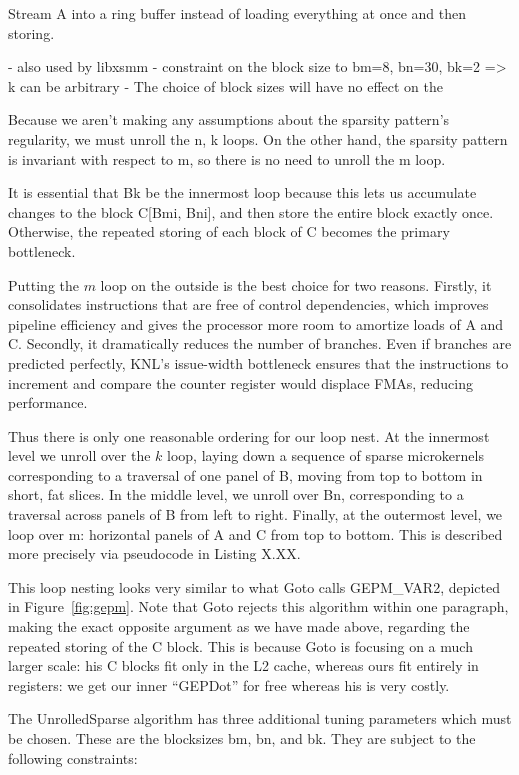 Stream A into a ring buffer instead of loading everything at once and then storing.

  - also used by libxsmm
  - constraint on the block size to bm=8, bn=30, bk=2 => k can be arbitrary
  - The choice of block sizes will have no effect on the 

Because we aren't making any assumptions about the sparsity pattern's regularity, we must unroll the n, k loops. On the other hand, the sparsity pattern is invariant with respect to m, so there is no need to unroll the m loop. 

It is essential that Bk be the innermost loop because this lets us accumulate changes to the block C[Bmi, Bni], and then store the entire block exactly once. Otherwise, the repeated storing of each block of C becomes the primary bottleneck. 

Putting the $m$ loop on the outside is the best choice for two reasons. Firstly, it consolidates instructions that are free of control dependencies, which improves pipeline efficiency and gives the processor more room to amortize loads of A and C. Secondly, it dramatically reduces the number of branches. Even if branches are predicted perfectly, KNL's issue-width bottleneck ensures that the instructions to increment and compare the counter register would displace FMAs, reducing performance. 

Thus there is only one reasonable ordering for our loop nest. At the innermost level we unroll over the $k$ loop, laying down a sequence of sparse microkernels corresponding to a traversal of one panel of B, moving from top to bottom in short, fat slices. In the middle level, we unroll over Bn, corresponding to a traversal across panels of B from left to right. Finally, at the outermost level, we loop over m: horizontal panels of A and C from top to bottom. This is described more precisely via pseudocode in Listing X.XX.

This loop nesting looks very similar to what Goto calls GEPM\_VAR2, depicted in Figure~\ref{fig:gepm}. Note that Goto rejects this algorithm within one paragraph, making the exact opposite argument as we have made above, regarding the repeated storing of the C block. This is because Goto is focusing on a much larger scale: his C blocks fit only in the L2 cache, whereas ours fit entirely in registers: we get our inner ``GEPDot'' for free whereas his is very costly.

The UnrolledSparse algorithm has three additional tuning parameters which must be chosen. These are the blocksizes bm, bn, and bk. They are subject to the following constraints:

